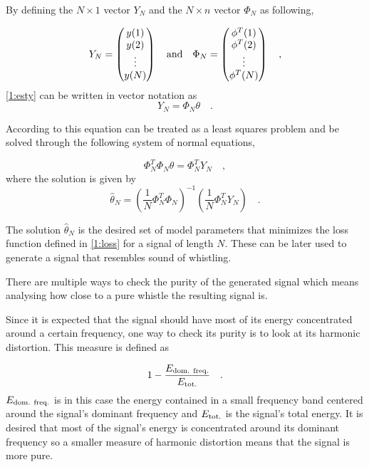 \documentclass{IEEEtran}
\begin{document}
By defining the $N\times1$ vector $Y_N$ and the $N\times n$ vector
$\Phi_N$ as following,

\begin{equation*}
  Y_N =
  \begin{pmatrix}
    y(1) \\ y(2) \\ \vdots \\ y(N)
  \end{pmatrix}
  \quad
  \textnormal{and}
  \quad
  \Phi_N =
  \begin{pmatrix}
    \phi^T(1) \\ \phi^T(2) \\ \vdots \\ \phi^T(N)
  \end{pmatrix}
  \quad ,
\end{equation*}
\eqref{1:esty} can be written in vector notation as
\begin{equation*}
  Y_N = \Phi_N\theta \quad .
\end{equation*}

According to \cite{signalproc} this equation can be treated as a least
squares problem and be solved through the following system of normal
equations,

\begin{equation*}
  \Phi_N^T\Phi_N\theta = \Phi_N^T Y_N \quad ,
\end{equation*}
where the solution is given by
\begin{equation*}
  \hat{\theta}_N = \left( \frac{1}{N}\Phi_N^T\Phi_N \right)^{-1}
                   \left( \frac{1}{N}\Phi_N^T Y_N \right)
  \quad .
\end{equation*}

The solution $\hat{\theta}_N$ is the desired set of model parameters
that minimizes the loss function defined in \ref{1:loss} for a signal
of length $N$. These can be later used to generate a signal that
resembles sound of whistling.

There are multiple ways to check the purity of the generated signal which
means analysing how close to a pure whistle the resulting signal is.

Since it is expected that the signal should have most of its energy
concentrated around a certain frequency, one way to check its purity
is to look at its harmonic distortion. This measure is defined as

\begin{equation}
  \label{1:hdist}
  1 - \frac{E_{\textnormal{dom. freq.}}}{E_{\textnormal{tot.}}}\quad .
\end{equation}
$E_{\textnormal{dom. freq.}}$ is in this case the energy contained in
a small frequency band centered around the signal's dominant frequency
and $E_{\textnormal{tot.}}$ is the signal's total energy. It is desired
that most of the signal's energy is concentrated around its dominant
frequency so a smaller measure of harmonic distortion means that the
signal is more pure.
\end{document}
